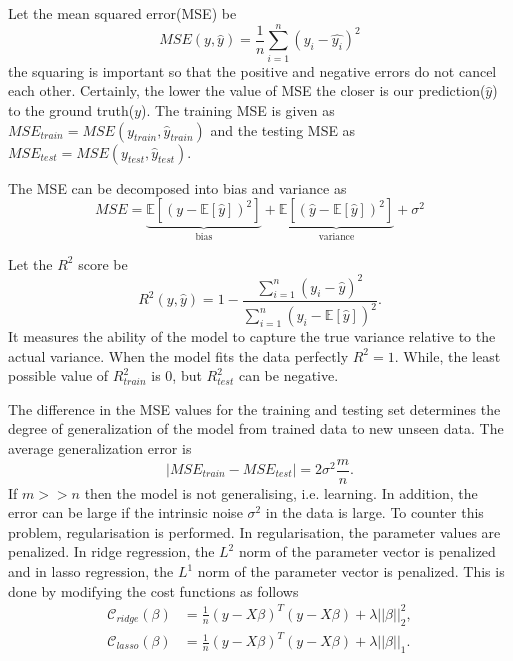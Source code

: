Let the mean squared error(MSE) be 
\begin{equation}
    MSE(y, \hat{y}) = \frac{1}{n}\sum_{i=1}^{n}(y_i - \hat{y_i})^2
\end{equation}
the squaring is important so that the positive and negative errors do not cancel each other. Certainly, the lower the value of MSE the closer is our prediction($\hat{y}$) to the ground truth($y$). The training MSE is given as $MSE_{train} = MSE(y_{train}, \hat{y}_{train})$ and the testing MSE as $MSE_{test} = MSE(y_{test}, \hat{y}_{test})$. 

The MSE can be decomposed into bias and variance as 
\begin{equation}
    MSE = \underbrace{\mathbb{E}[(y - \mathbb{E}[\hat{y}])^2]}_{\text{bias}} + \underbrace{\mathbb{E}[(\hat{y} - \mathbb{E}[\hat{y}])^2]}_{\text{variance}} + \sigma^2
\end{equation}

Let the $R^2$ score be 
\begin{equation}
    R^2(y, \hat{y}) = 1 - \frac{\sum_{i=1}^{n}(y_i-\hat{y})^2}{\sum_{i=1}^{n}(y_i-\mathbb{E}[\hat{y}])^2}.
\end{equation} 
It measures the ability of the model to capture the true variance relative to the actual variance. When the model fits the data perfectly $R^2=1$. While, the least possible value of $R^2_{train}$ is 0, but $R^2_{test}$ can be negative.  

The difference in the MSE values  for the training and testing set determines the degree of generalization of the model from trained data to new unseen data. The average generalization error is \cite{mehta2019high}
\begin{equation*}
    |MSE_{train} - MSE_{test}| = 2\sigma^2\frac{m}{n}.
\end{equation*}
If $m >> n$ then the model is not generalising, i.e. learning. In addition, the error can be large if the intrinsic noise $\sigma^2$ in the data is large. To counter this problem, regularisation is performed. In regularisation, the parameter values are penalized. In ridge regression, the $L^2$ norm of the parameter vector is penalized and in lasso regression, the $L^1$ norm of the parameter vector is penalized. This is done by modifying the cost functions as follows
\begin{align}
    \mathcal{C}_{ridge}(\beta) &=  \frac{1}{n}( y -  {X\beta})^T( y -  {X\beta}) + \lambda||\beta||_2^2, \\
    \mathcal{C}_{lasso}(\beta) &=  \frac{1}{n}( y -  {X\beta})^T( y -  {X\beta}) + \lambda||\beta||_1.
\end{align}

